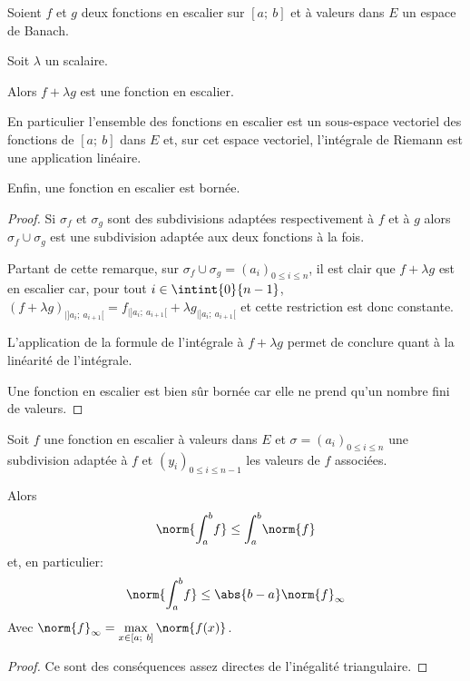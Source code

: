 \begin{prop}
Soient $f$ et $g$ deux fonctions en escalier sur $[a;~b]$ et à valeurs dans $E$ un espace de Banach.

Soit $\lambda$ un scalaire.

Alors $f+\lambda g$ est une fonction en escalier.

En particulier l'ensemble des fonctions en escalier est un sous-espace vectoriel des fonctions de $[a;~b]$ dans $E$ et, sur cet espace vectoriel, l'intégrale de Riemann est une application linéaire.

Enfin, une fonction en escalier est bornée.
\end{prop}

\begin{proof}
Si $\sigma_f$ et $\sigma_g$ sont des subdivisions adaptées respectivement à $f$ et à $g$ alors $\sigma_f \cup \sigma_g$ est une subdivision adaptée aux deux fonctions à la fois.

Partant de cette remarque, sur $\sigma_f \cup \sigma_g = (a_i)_{0 \leq i \leq n}$, il est clair que $f+\lambda g$ est en escalier car, pour tout $i \in \intint{0}{n-1}$, $\left(f+\lambda g\right)_{|]a_i;~a_{i+1}[} = f_{|]a_i;~a_{i+1}[} + \lambda g_{|]a_i;~a_{i+1}[}$ et cette restriction est donc constante.

L'application de la formule de l'intégrale à $f + \lambda g$ permet de conclure quant à la linéarité de l'intégrale.

Une fonction en escalier est bien sûr bornée car elle ne prend qu'un nombre fini de valeurs.
\end{proof}

\begin{prop}
Soit $f$ une fonction en escalier à valeurs dans $E$ et $\sigma=(a_i)_{0 \leq i \leq n}$ une subdivision adaptée à $f$ et $(y_i)_{0 \leq i \leq n-1}$ les valeurs de $f$ associées.

Alors
\[
\norm{\displaystyle{\int_a^b} f} \leq \displaystyle{\int_a^b} \norm{f}
\]
et, en particulier:
\[
\norm{\displaystyle{\int_a^b} f} \leq \abs{b-a} \norm{f}_{\infty}
\]
Avec $\norm{f}_{\infty} = \max \limits_{x \in [a;~b]} \norm{f(x)}$.
\end{prop}

\begin{proof}
Ce sont des conséquences assez directes de l'inégalité triangulaire.
\end{proof}

